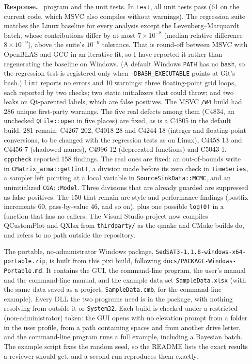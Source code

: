 \documentclass[11pt]{article}
\newcommand{\code}[1]{\texttt{#1}}
\newenvironment{response}{\par\noindent\textbf{Response.}\ }{\par\medskip}
\begin{document}
\begin{response}
program and the unit tests. In \code{test}, all unit tests pass (61 on the
current code, which MSVC also compiles without warnings). The
regression suite matches the Linux baseline for every analysis except the
Levenberg--Marquardt batch, whose contributions differ by at most
$7\times10^{-8}$ (median relative difference $8\times10^{-9}$), above the
suite's $10^{-9}$ tolerance. That is round-off between MSVC with OpenBLAS and
GCC in an iterative fit, so I have reported it rather than regenerating the
baseline on Windows. (A default Windows \code{PATH} has no \code{bash}, so the
regression test is registered only when \code{-DBASH\_\allowbreak{}EXECUTABLE}
points at Git's bash.) \code{lint} reports no errors and 10 warnings: three
floating-point grid loops, each reported by two checks; two static
initializers that could throw; and two leaks on Qt-parented labels, which are
false positives. The MSVC \code{/W4} build had 286 unique first-party
warnings. The five real defects among them (C4834, an unchecked
\code{QFile::\allowbreak{}open} in five places) are fixed, as is a C4805 in the
default build. 281 remain: C4267 202, C4018 28 and C4244 18 (integer and
floating-point conversions, to be changed with the regression tests as on
Linux), C4458 13 and C4456 7 (shadowed names), C4996 12 (deprecated
functions) and C5043 1. \code{cppcheck} reported 158 findings. The real ones
are fixed: an out-of-bounds write in \code{CMatrix\_\allowbreak{}arma::\allowbreak{}get(int)}, a
division made before its zero check in \code{TimeSeries}, a sampler left
pointing at a local variable in \code{SourceSinkData::\allowbreak{}MCMC}, and an
uninitialized \code{CGA::\allowbreak{}Model}. Three divisions that are already
guarded are suppressed as false positives. The 150 that remain are style and
performance findings (postfix increments 60, pass-by-value 46, and so on),
plus one possible \code{log(0)} in a function that has no callers.
The Visual Studio project now compiles QCustomPlot and QXlsx from
\code{thirdparty/} as the qmake and CMake builds do, and refers to no path
outside the repository.

The portable, no-administrator Windows package,
\code{SedSAT3-1.1.8-windows-x64-portable.\allowbreak{}zip}, is built from this pixi
build, following \code{docs/\allowbreak{}PACKAGE-Windows-Portable.\allowbreak{}md}. It contains
the GUI, the command-line program, the user's manual and the command-line
manual, and the example data set \code{SampleData.\allowbreak{}xlsx} (with the same
data saved as a project, \code{SampleData.\allowbreak{}cmb}, for the command-line
example). Every DLL the two
programs need is in the package, with nothing resolving from outside it or
\code{System32}. Each build is checked under a restricted
(non-administrator) token: the GUI opens with no elevation prompt from a
folder in the user profile, from a path containing spaces and from another
drive letter, and the command-line program runs a full example, including a
Bayesian batch. The example script fixes the random seed, so the README lists
the exact results a reviewer should get, and a second run reproduces them
exactly.


\end{response}
\end{document}
